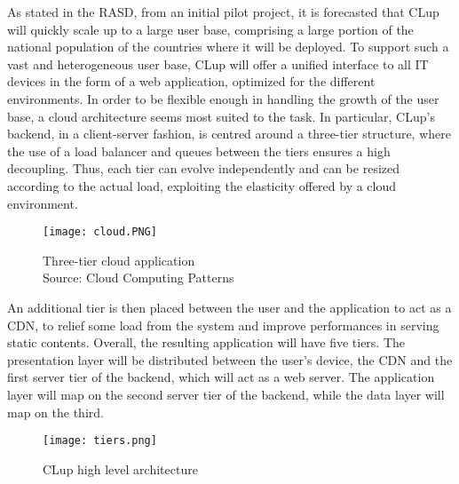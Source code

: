 \documentclass[../../main.tex]{subfiles}
\begin{document}
As stated in the RASD, from an initial pilot project, it is forecasted that CLup will quickly scale up to a large user base, 
comprising a large portion of the national population of the countries where it will be deployed. 
To support such a vast and heterogeneous user base, 
CLup will offer a unified interface to all IT devices in the form of a web application, optimized for the different environments.
In order to be flexible enough in handling the growth of the user base, a cloud architecture seems most suited to the task. 
In particular, CLup's backend, in a client-server fashion, is centred around a three-tier structure, where the use of a load balancer 
and queues between the tiers ensures a high decoupling. 
Thus, each tier can evolve independently and can be resized according to the actual load, 
exploiting the elasticity offered by a cloud environment.

\begin{figure}[H]
    \centering
    \texttt{[image: cloud.PNG]}
    \caption{
        Three-tier cloud application\\
        Source: Cloud Computing Patterns
    }
\end{figure}

An additional tier is then placed between the user and the application to act as a CDN, to relief some load from the system and improve performances in serving static contents. Overall,
 the resulting application will have five tiers.
The presentation layer will be distributed between the user's device, the CDN and the first server tier of the backend, which will act as a web server. The application layer will map on the second server tier of the backend, while the data layer will map on the third.


\begin{figure}[H]
    \centering
    \texttt{[image: tiers.png]}
    \caption{
        CLup high level architecture
    }
\end{figure}
\end{document}

